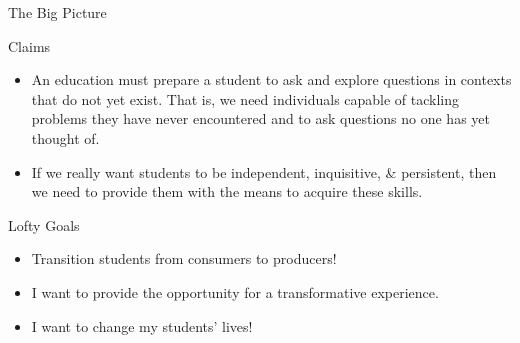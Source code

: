 \documentclass[10pt]{beamer}
\begin{document}

\begin{frame}{The Big Picture}

\begin{block}{Claims}
\vspace{-.75em}
\begin{itemize}
\item An education must prepare a student to ask and explore questions in contexts that do not yet exist. That is, we need individuals capable of tackling problems they have never encountered and to ask questions no one has yet thought of.
\item If we really want students to be independent, inquisitive, \& persistent, then we need to provide them with the means to acquire these skills.
\end{itemize}
\end{block}

\begin{block}{Lofty Goals}
\vspace{-.75em}
\begin{itemize}
\item Transition students from consumers to producers!
\item I want to provide the opportunity for a transformative experience. 
\item I want to change my students' lives!
\end{itemize}
\end{block}

\end{frame}

\end{document}
